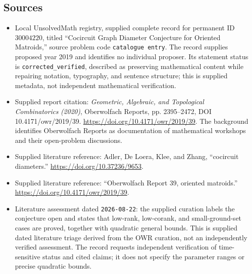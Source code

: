 \documentclass[11pt]{article}
\begin{document}
\subsection{Sources}
\begin{itemize}
\item Local UnsolvedMath registry, supplied complete record for permanent ID \(30004220\), titled ``Cocircuit Graph Diameter Conjecture for Oriented Matroids,'' source problem code \texttt{catalogue entry}. The record supplies proposed year 2019 and identifies no individual proposer. Its statement status is \texttt{corrected\_verified}, described as preserving mathematical content while repairing notation, typography, and sentence structure; this is supplied metadata, not independent mathematical verification.
\item Supplied report citation: \emph{Geometric, Algebraic, and Topological Combinatorics (2020)}, Oberwolfach Reports, pp. 2395--2472, DOI 10.4171/owr/2019/39. \url{https://doi.org/10.4171/owr/2019/39}. The background identifies Oberwolfach Reports as documentation of mathematical workshops and their open-problem discussions.
\item Supplied literature reference: Adler, De Loera, Klee, and Zhang, ``cocircuit diameters.'' \url{https://doi.org/10.37236/9653}.
\item Supplied literature reference: ``Oberwolfach Report 39, oriented matroids.'' \url{https://doi.org/10.4171/owr/2019/39}.
\item Literature assessment dated \texttt{2026-08-22}: the supplied curation labels the conjecture open and states that low-rank, low-corank, and small-ground-set cases are proved, together with quadratic general bounds. This is supplied dated literature triage derived from the OWR curation, not an independently verified assessment. The record requests independent verification of time-sensitive status and cited claims; it does not specify the parameter ranges or precise quadratic bounds.
\end{itemize}
\end{document}

